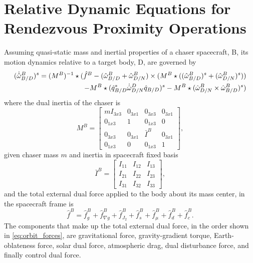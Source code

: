 \documentclass[letterpaper, preprint, paper,11pt]{AAS}	%
\begin{document}
\section{Relative Dynamic Equations for Rendezvous Proximity Operations}
Assuming quasi-static mass and inertial properties of a chaser spacecraft, B, its motion dynamics relative to a target body, D, are governed by
\begin{equation}
\begin{aligned}
	\label{eq:dyn}
	(\dot{\hat{\omega}}^B_{B/D})^s = (M^B)^{-1}\star(\hat{f}^B-(\hat{\omega}^B_{B/D}+\hat{\omega}^B_{D/N})\times(M^B\star((\hat{\omega}^B_{B/D})^s+(\hat{\omega}^B_{D/N})^s))\\-M^B\star(\hat{q}^*_{B/D}\dot{\hat{\omega}}^D_{D/N}\hat{q}_{B/D})^s-M^B\star(\hat{\omega}^B_{D/N}\times\hat{\omega}^B_{B/D})^s)
\end{aligned}\\
\end{equation}
where the dual inertia of the chaser is
\begin{equation}
\label{eq:dual_inertia}
M^B = 
\begin{bmatrix} 
mI_{3x3} & 0_{3x1} & 0_{3x3} & 0_{3x1} \\ 
0_{1x3} & 1 & 0_{1x3} & 0 \\ 
0_{3x3} & 0_{3x1} & \bar{I}^B & 0_{3x1} \\ 
0_{1x3} & 0 & 0_{1x3} & 1 
\end{bmatrix}, 
\end{equation}
given chaser mass $m$ and inertia in spacecraft fixed basis
\begin{equation}
\label{eq:sc_inertia}
\bar{I}^B = 
\begin{bmatrix} 
I_{11} & I_{12}& I_{13} \\ 
I_{21} & I_{22}& I_{23}\\ 
I_{31} & I_{32}& I_{33}
\end{bmatrix},
\end{equation}
and the total external dual force applied to the body about its mass center, in the spacecraft frame is
\begin{equation}
\label{eq:orbit_forces}
\hat{f}^B = \hat{f}^B_g + \hat{f}^B_{\nabla g} + \hat{f}^B_{J_2} +\hat{f}^B_{s}+\hat{f}^B_{\mu} + \hat{f}^B_d + \hat{f}^B_c.
\end{equation}
The components that make up the total external dual force, in the order shown in \eqref{eq:orbit_forces}, are gravitational force, gravity-gradient torque, Earth-oblateness force, solar dual force, atmospheric drag, dual disturbance force, and finally control dual force.
\end{document}
